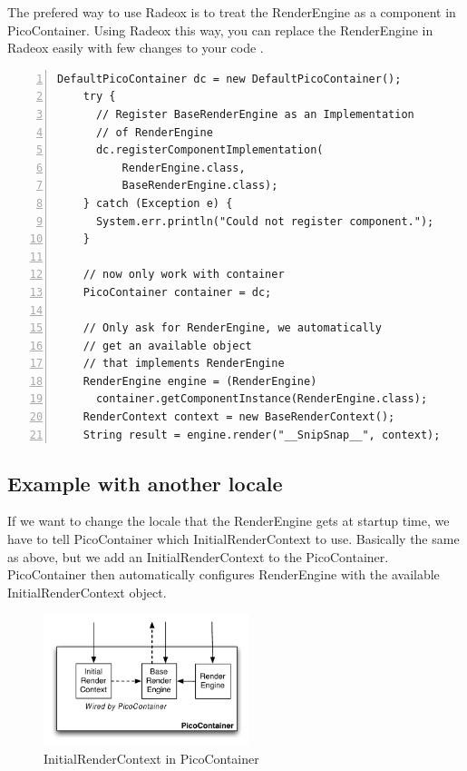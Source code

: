 \documentclass[a4paper,pdftex]{article}
\begin{document}
The prefered way to use Radeox is to treat the RenderEngine as a component in PicoContainer. Using Radeox this way, you
can replace the RenderEngine in Radeox easily with few changes to your code .

\begin{Verbatim}[gobble=4,frame=single,numbers=left,fontsize=\small]
    DefaultPicoContainer dc = new DefaultPicoContainer();
    try {
      // Register BaseRenderEngine as an Implementation
      // of RenderEngine
      dc.registerComponentImplementation(
          RenderEngine.class,
          BaseRenderEngine.class);
    } catch (Exception e) {
      System.err.println("Could not register component.");
    }

    // now only work with container
    PicoContainer container = dc;

    // Only ask for RenderEngine, we automatically
    // get an available object
    // that implements RenderEngine
    RenderEngine engine = (RenderEngine)
      container.getComponentInstance(RenderEngine.class);
    RenderContext context = new BaseRenderContext();
    String result = engine.render("__SnipSnap__", context);
\end{Verbatim}

\subsection{Example with another locale}

If we want to change the locale that the RenderEngine gets at startup time, we have
to tell PicoContainer which InitialRenderContext to use. Basically the same as above, 
but we add an InitialRenderContext to the PicoContainer. PicoContainer then 
automatically configures RenderEngine with the available InitialRenderContext object.

\begin{figure}[ht]
  \centering
    \includegraphics[keepaspectratio,width=6cm]{images/InitialRenderContextPicoContainer}
     \caption{\small\textsf InitialRenderContext in PicoContainer}
\end{figure}
\end{document}
